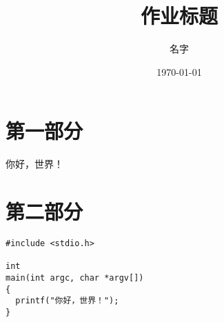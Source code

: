\documentclass{bjtuhw}
\title{作业标题}
\author{名字}
\date{\today}
\begin{document}
\maketitle
\newpage

\section{第一部分}
你好，世界！


\section{第二部分}
\begin{verbatim}
#include <stdio.h>

int
main(int argc, char *argv[])
{
  printf("你好，世界！");
}
\end{verbatim}
\end{document}
